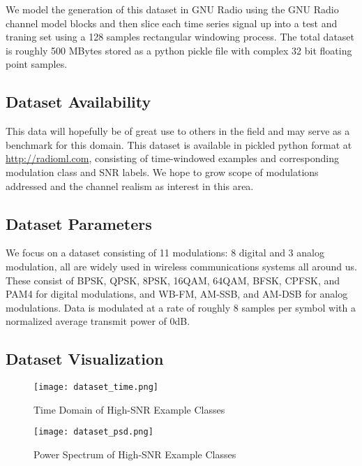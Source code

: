 \documentclass[runningheads,a4paper]{llncs}
\begin{document}
We model the generation of this dataset in GNU Radio \cite{gnuradio} using the GNU Radio channel model \cite{channelmodel} blocks and then slice each time series signal up into a test and traning set using a 128 samples rectangular windowing process.  The total dataset is roughly 500 MBytes stored as a python pickle file with complex 32 bit floating point samples.

\subsection{Dataset Availability}

This data will hopefully be of great use to others in the field and may serve as a benchmark for this domain.  This dataset is available in pickled python format at \url{http://radioml.com}, consisting of time-windowed examples and corresponding modulation class and SNR labels.  We hope to grow scope of modulations addressed and the channel realism as interest in this area.

\subsection{Dataset Parameters}

We focus on a dataset consisting of 11 modulations: 8 digital and 3 analog modulation, all are widely used in wireless communications systems all around us.   These consist of BPSK, QPSK, 8PSK, 16QAM, 64QAM, BFSK, CPFSK, and PAM4 for digital modulations, and WB-FM, AM-SSB, and AM-DSB for analog modulations.  Data is modulated at a rate of roughly 8 samples per symbol with a normalized average transmit power of 0dB.

\subsection{Dataset Visualization}

\begin{figure}[ht]
\centering
\begin{minipage}[b]{0.45\linewidth}
      \texttt{[image: dataset\_time.png]}
  \caption{Time Domain of High-SNR Example Classes}
\label{fig:timedomain}
\end{minipage}
\quad
\begin{minipage}[b]{0.45\linewidth}
      \texttt{[image: dataset\_psd.png]}
  \caption{Power Spectrum of High-SNR Example Classes}
\label{fig:powerspectrum}
\end{minipage}
\end{figure}
\end{document}
